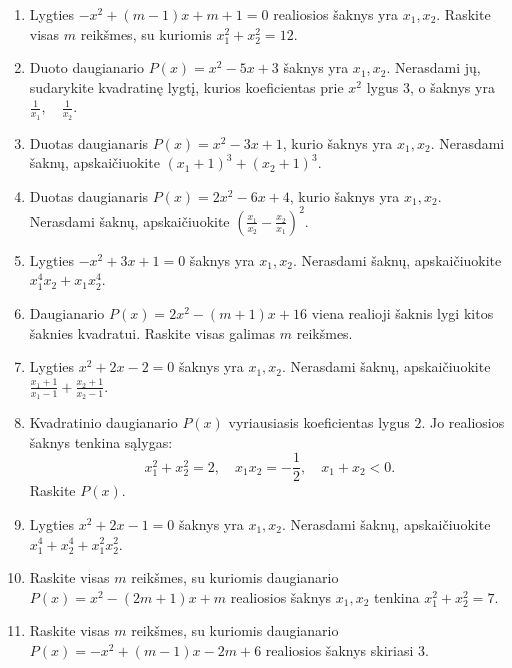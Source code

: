 \documentclass[11pt,a4paper]{article}
\begin{document}
\begin{enumerate}
\item Lygties \(-x^2+(m-1)x+m+1=0\) realiosios šaknys yra \(x_1,x_2\). Raskite visas \(m\) reikšmes, su kuriomis \mbox{\(x_1^2+x_2^2=12\)}.
\item Duoto daugianario \(P(x)=x^2-5x+3\) šaknys yra \(x_1,x_2\). Nerasdami jų, sudarykite kvadratinę lygtį, kurios koeficientas prie \(x^2\) lygus \(3\), o šaknys yra \mbox{\(\frac1{x_1},\quad\frac1{x_2}\)}.
\item Duotas daugianaris \(P(x)=x^2-3x+1\), kurio šaknys yra \(x_1,x_2\). Nerasdami šaknų, apskaičiuokite \mbox{\((x_1+1)^3+(x_2+1)^3\)}.
\item Duotas daugianaris \(P(x)=2x^2-6x+4\), kurio šaknys yra \(x_1,x_2\). Nerasdami šaknų, apskaičiuokite \mbox{\(\left(\frac{x_1}{x_2}-\frac{x_2}{x_1}\right)^2\)}.
\item Lygties \(-x^2+3x+1=0\) šaknys yra \(x_1,x_2\). Nerasdami šaknų, apskaičiuokite \mbox{\(x_1^4x_2+x_1x_2^4\)}.
\item Daugianario \(P(x)=2x^2-(m+1)x+16\) viena realioji šaknis lygi kitos šaknies kvadratui. Raskite visas galimas \(m\) reikšmes.
\item Lygties \(x^2+2x-2=0\) šaknys yra \(x_1,x_2\). Nerasdami šaknų, apskaičiuokite \mbox{\(\frac{x_1+1}{x_1-1}+\frac{x_2+1}{x_2-1}\)}.
\item \begin{minipage}[t]{\linewidth}Kvadratinio daugianario \(P(x)\) vyriausiasis koeficientas lygus \(2\). Jo realiosios šaknys tenkina sąlygas: \[x_1^2+x_2^2=2,\quad x_1x_2=-\frac12,\quad x_1+x_2<0.\] Raskite \(P(x)\).\end{minipage}
\item Lygties \(x^2+2x-1=0\) šaknys yra \(x_1,x_2\). Nerasdami šaknų, apskaičiuokite \mbox{\(x_1^4+x_2^4+x_1^2x_2^2\)}.
\item Raskite visas \(m\) reikšmes, su kuriomis daugianario \(P(x)=x^2-(2m+1)x+m\) realiosios šaknys \(x_1,x_2\) tenkina \mbox{\(x_1^2+x_2^2=7\)}.
\item Raskite visas \(m\) reikšmes, su kuriomis daugianario \(P(x)=-x^2+(m-1)x-2m+6\) realiosios šaknys skiriasi \(3\).
\end{enumerate}
\clearpage
\end{document}
